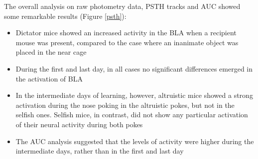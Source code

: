 \documentclass[12pt, a4paper]{report}
\begin{document}
The overall analysis on raw photometry data, PSTH tracks and AUC showed some remarkable results (Figure \ref{psth}):

\begin{itemize}
	
	\item Dictator mice showed an increased activity in the BLA when a recipient mouse was present, compared to the case where an inanimate object was placed in the near cage
	
	\item During the first and last day, in all cases no significant differences emerged in the activation of BLA
	
	\item In the intermediate days of learning, however, altruistic mice showed a strong activation during the nose poking in the altruistic pokes, but not in the selfish ones. Selfish mice, in contrast, did not show any particular activation of their neural activity during both pokes
	
	\item The AUC analysis suggested that the levels of activity were higher during the intermediate days, rather than in the first and last day
\end{itemize}
\end{document}
